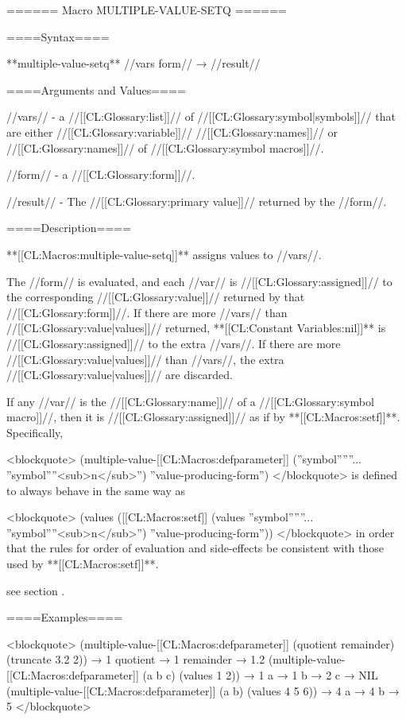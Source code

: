 ====== Macro MULTIPLE-VALUE-SETQ ======

====Syntax====

**multiple-value-setq** //vars form// → //result//

====Arguments and Values====

//vars// - a //[[CL:Glossary:list]]// of //[[CL:Glossary:symbol|symbols]]// that are either //[[CL:Glossary:variable]]// //[[CL:Glossary:names]]// or //[[CL:Glossary:names]]// of //[[CL:Glossary:symbol macros]]//.

//form// - a //[[CL:Glossary:form]]//.

//result// - The //[[CL:Glossary:primary value]]// returned by the //form//.

====Description====

**[[CL:Macros:multiple-value-setq]]** assigns values to //vars//.

The //form// is evaluated, and each //var// is //[[CL:Glossary:assigned]]// to the corresponding //[[CL:Glossary:value]]// returned by that //[[CL:Glossary:form]]//. If there are more //vars// than //[[CL:Glossary:value|values]]// returned, **[[CL:Constant Variables:nil]]** is //[[CL:Glossary:assigned]]// to the extra //vars//. If there are more //[[CL:Glossary:value|values]]// than //vars//, the extra //[[CL:Glossary:value|values]]// are discarded.

If any //var// is the //[[CL:Glossary:name]]// of a //[[CL:Glossary:symbol macro]]//, then it is //[[CL:Glossary:assigned]]// as if by **[[CL:Macros:setf]]**. Specifically,

\begingroup {} \def\subN{''<sub>n</sub>''} <blockquote> (multiple-value-[[CL:Macros:defparameter]] (''symbol''\subOne ... ''symbol''\subN) ''value-producing-form'') </blockquote> is defined to always behave in the same way as

<blockquote> (values ([[CL:Macros:setf]] (values ''symbol''\subOne ... ''symbol''\subN) ''value-producing-form'')) </blockquote> \endgroup in order that the rules for order of evaluation and side-effects be consistent with those used by **[[CL:Macros:setf]]**.

see section {\secref\SETFofVALUES}.

====Examples====

<blockquote> (multiple-value-[[CL:Macros:defparameter]] (quotient remainder) (truncate 3.2 2)) → 1 quotient → 1 remainder → 1.2 (multiple-value-[[CL:Macros:defparameter]] (a b c) (values 1 2)) → 1 a → 1 b → 2 c → NIL (multiple-value-[[CL:Macros:defparameter]] (a b) (values 4 5 6)) → 4 a → 4 b → 5 </blockquote>


